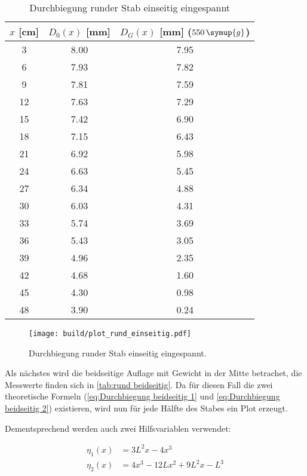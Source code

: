 \begin{table} [H]
  \centering
  \caption{Durchbiegung runder Stab einseitig eingespannt}
  \label{tab:rund einseitig}
  \begin{tabular}{S[table-format=2.0] S[table-format=2.0] S[table-format=2.0]}
    \toprule
    {$x$ [cm]} & {$D_{0}(x)$ [mm]} & {$D_{G}(x)$ [mm] ($550\,\symup{g}$)} \\
     & 8.00 & 7.95 \\
     6 & 7.93 & 7.82 \\
     9 & 7.81 & 7.59 \\
    12 & 7.63 & 7.29 \\
    15 & 7.42 & 6.90 \\ 
    18 & 7.15 & 6.43 \\
    21 & 6.92 & 5.98 \\
    24 & 6.63 & 5.45 \\
    27 & 6.34 & 4.88 \\
    30 & 6.03 & 4.31 \\
    33 & 5.74 & 3.69 \\
    36 & 5.43 & 3.05 \\
    39 & 4.96 & 2.35 \\
    42 & 4.68 & 1.60 \\
    45 & 4.30 & 0.98 \\
    48 & 3.90 & 0.24 \\ 
    \bottomrule
  \end{tabular}
\end{table}

\begin{figure} [H]
  \centering
  \texttt{[image: build/plot\_rund\_einseitig.pdf]}
  \caption{Durchbiegung runder Stab einseitig eingespannt.}
  \label{fig:rund_einseitig}
\end{figure}

Als nächstes wird die beidseitige Auflage mit Gewicht in der Mitte betrachet,
die Messwerte finden sich in \autoref{tab:rund beidseitig}.
Da für diesen Fall die zwei theoretische Formeln (\autoref{eq:Durchbiegung beidseitig 1} und \autoref{eq:Durchbiegung beidseitig 2}) existieren,
wird nun für jede Hälfte des Stabes ein Plot erzeugt.

Dementsprechend werden auch zwei Hilfsvariablen verwendet:

\begin{align}
  \eta_{1}(x)&=3L^{2}x-4x^{3}  \\
  \eta_{2}(x)&=4x^{3}-12Lx^{2}+9L^{2}x-L^{3}
\end{align}

